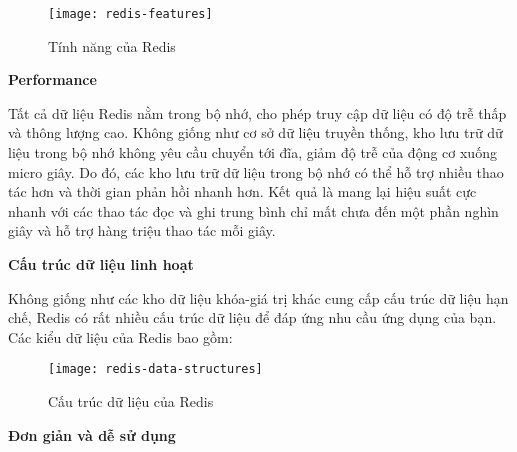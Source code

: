 \begin{figure}[ht]
	\centering
	\texttt{[image: redis-features]}
	\caption{Tính năng của Redis}
\end{figure}

\textbf{Performance}

Tất cả dữ liệu Redis nằm trong bộ nhớ, cho phép truy cập dữ liệu có độ trễ thấp và thông lượng cao. Không giống như cơ sở dữ liệu truyền thống, kho lưu trữ dữ liệu trong bộ nhớ không yêu cầu chuyển tới đĩa, giảm độ trễ của động cơ xuống micro giây. Do đó, các kho lưu trữ dữ liệu trong bộ nhớ có thể hỗ trợ nhiều thao tác hơn và thời gian phản hồi nhanh hơn. Kết quả là mang lại hiệu suất cực nhanh với các thao tác đọc và ghi trung bình chỉ mất chưa đến một phần nghìn giây và hỗ trợ hàng triệu thao tác mỗi giây.

\textbf{Cấu trúc dữ liệu linh hoạt}

Không giống như các kho dữ liệu khóa-giá trị khác cung cấp cấu trúc dữ liệu hạn chế, Redis có rất nhiều cấu trúc dữ liệu để đáp ứng nhu cầu ứng dụng của bạn. Các kiểu dữ liệu của Redis bao gồm:

\begin{figure}[ht]
	\centering
	\texttt{[image: redis-data-structures]}
	\caption{Cấu trúc dữ liệu của Redis}
\end{figure}

\begin{itemize}
\end{itemize}

\textbf{Đơn giản và dễ sử dụng}

